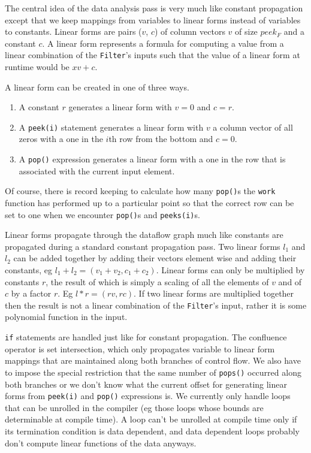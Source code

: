 The central idea of the data analysis pass is very much like constant propagation
except that we keep mappings from variables to linear forms instead of variables to
constants. Linear forms are pairs ($v$, $c$) of column vectors $v$ of size $peek_{F}$ 
and a constant $c$. A linear form represents a formula for computing a value from a
linear combination of the {\tt Filter}'s inputs such that the value of a 
linear form at runtime would be $xv + c$.

A linear form can be created in one of three ways. 
\begin{enumerate}
\item A constant $r$ generates a linear form with $v=0$ and $c=r$. 
\item A {\tt peek(i)} statement generates a linear form with $v$ a column vector of all zeros with 
a one in the $i$th row from the bottom and $c=0$. 
\item A {\tt pop()} expression generates a linear form with a one in the row that is associated with 
the current input element. 
\end{enumerate}

Of course, there is record keeping to calculate how many {\tt pop()}s
the {\tt work} function has performed up to a particular point so that the correct
row can be set to one when we encounter {\tt pop()}s and {\tt peeks(i)}s.

Linear forms propagate through the dataflow graph much like constants are propagated
during a standard constant propagation pass. Two linear forms $l_{1}$ and $l_{2}$ can
be added together by adding their vectors element wise and adding their constants, eg 
$l_1+l_2=(v_1+v_2, c_1+c_2)$. Linear forms can only be multiplied by constants $r$, 
the result of which is simply a scaling of all the elements of $v$ and of $c$ by a factor
$r$. Eg $l*r = (rv,rc)$. If two linear forms are multiplied together 
then the result is not a linear combination of the {\tt Filter}'s input, rather it is
some polynomial function in the input.

{\tt if} statements are handled just like for constant propagation. The confluence operator
is set intersection, which only propagates variable to linear form mappings that are
maintained along both branches of control flow. We also have to impose the special restriction that the
same number of {\tt pops()} occurred along both branches or we don't know what the current offset
for generating linear forms from {\tt peek(i)} and {\tt pop()} expressions is. 
We currently only handle loops that can be unrolled in the 
compiler (eg those loops whose bounds are determinable at compile time). 
A loop can't be unrolled at compile time only if its termination condition is data 
dependent, and data dependent loops probably don't compute linear 
functions of the data anyways.


